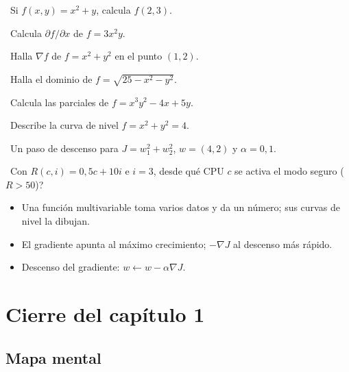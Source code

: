 \begin{tmejercicios}
\label{ej:1-5}
\begin{tmlista}
\item \tmbasico\ Si $f(x, y)=x^2+y$, calcula $f(2, 3)$.
\item \tmbasico\ Calcula $\partial f/\partial x$ de $f=3x^2y$.
\item \tmbasico\ Halla $\nabla f$ de $f=x^2+y^2$ en el punto $(1, 2)$.
\item \tmmedio\ Halla el dominio de $f=\sqrt{25-x^2-y^2}$.
\item \tmmedio\ Calcula las parciales de $f=x^3y^2-4x+5y$.
\item \tmmedio\ Describe la curva de nivel $f=x^2+y^2=4$.
\item \tmdificil\ Un paso de descenso para $J=w_1^2+w_2^2$, $w=(4, 2)$ y $\alpha=0{,}1$.
\item \tmdificil\ Con $R(c, i)=0{,}5c+10i$ e $i=3$, \textquestiondown desde qu\'e CPU $c$ se activa el modo seguro ($R>50$)?
\end{tmlista}
\end{tmejercicios}


\begin{tmresumen}
\begin{itemize}
\item Una funci\'on multivariable toma varios datos y da un n\'umero; sus curvas de nivel la dibujan.
\item El gradiente apunta al m\'aximo crecimiento; $-\nabla J$ al descenso m\'as r\'apido.
\item Descenso del gradiente: $w\leftarrow w-\alpha\nabla J$.
\end{itemize}
\end{tmresumen}

\clearpage
\section*{Cierre del cap\'itulo 1}
\subsection{Mapa mental}

